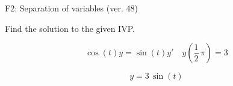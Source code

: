 \begin{exercise}
  \begin{exerciseTitle}F2: Separation of variables (ver. 48)\end{exerciseTitle}
  \begin{exerciseStatement}
    
Find the solution to the given IVP.

    
\[\cos\left(t\right) y= \sin\left(t\right) y'\hspace{1em} y\left( \frac{1}{2} \, \pi \right)= 3\]

  \end{exerciseStatement}
  \begin{exerciseAnswer}
    
\[y= 3 \, \sin\left(t\right)\]

  \end{exerciseAnswer}
\end{exercise}